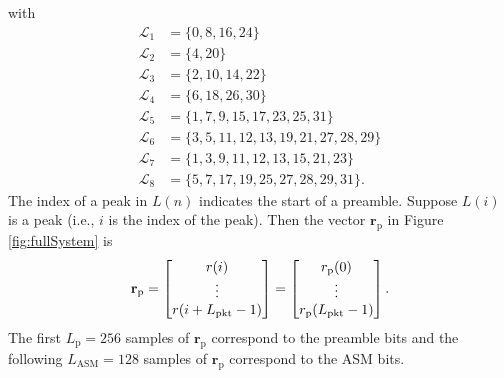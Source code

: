 with
\begin{equation}
	\begin{split}
	\mathcal{L}_1 &= \{ 0, 8, 16, 24 \}\\
	\mathcal{L}_2 &= \{ 4, 20 \}\\
	\mathcal{L}_3 &= \{ 2, 10, 14, 22 \}\\
	\mathcal{L}_4 &= \{ 6, 18, 26, 30 \}\\
	\mathcal{L}_5 &= \{ 1, 7,  9, 15, 17, 23, 25, 31 \}\\
	\mathcal{L}_6 &= \{ 3, 5, 11, 12, 13, 19, 21, 27, 28, 29 \}\\
	\mathcal{L}_7 &= \{ 1, 3,  9, 11, 12, 13, 15, 21, 23 \}\\
	\mathcal{L}_8 &= \{ 5, 7, 17, 19, 25, 27, 28, 29, 31 \}.
\end{split}
\label{eq:gpu-L-pedone-geoghegan-4}
\end{equation}
The index of a peak in $L(n)$ indicates the start of a preamble.
Suppose $L(i)$ is a peak (i.e., $i$ is the index of the peak).
Then the vector $\mathbf{r}_\text{p}$ in Figure \ref{fig:fullSystem} is 
\begin{equation}
\mathbf{r}_\text{p} = 
\begin{bmatrix}
r(i) \\ 
\vdots \\ 
r(i+L_\text{pkt}-1)
\end{bmatrix}
=
\begin{bmatrix}
r_\text{p}(0) \\ 
\vdots \\ 
r_\text{p}(L_\text{pkt}-1)
\end{bmatrix}.
\end{equation}
The first $L_\text{p} = 256$ samples of $\mathbf{r}_\text{p}$ correspond to the preamble bits and the following
$L_\text{ASM} = 128$ samples of $\mathbf{r}_\text{p}$ correspond to the ASM bits.


